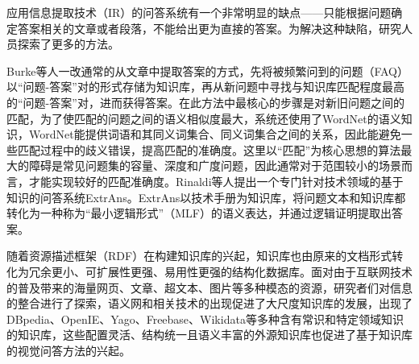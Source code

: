应用信息提取技术（IR）的问答系统有一个非常明显的缺点——只能根据问题确定答案相关的文章或者段落，不能给出更为直接的答案。为解决这种缺陷，研究人员探索了更多的方法。

Burke等人一改通常的从文章中提取答案的方式，先将被频繁问到的问题（FAQ）以“问题-答案”对的形式存储为知识库，再从新问题中寻找与知识库匹配程度最高的“问题-答案”对，进而获得答案。在此方法中最核心的步骤是对新旧问题之间的匹配，为了使匹配的问题之间的语义相似度最大，系统还使用了WordNet的语义知识，WordNet能提供词语和其同义词集合、同义词集合之间的关系，因此能避免一些匹配过程中的歧义错误，提高匹配的准确度。这里以“匹配”为核心思想的算法最大的障碍是常见问题集的容量、深度和广度问题，因此通常对于范围较小的场景而言，才能实现较好的匹配准确度。Rinaldi等人提出一个专门针对技术领域的基于知识的问答系统ExtrAns。ExtrAns以技术手册为知识库，将问题文本和知识库都转化为一种称为“最小逻辑形式”（MLF）的语义表达，并通过逻辑证明提取出答案。

随着资源描述框架（RDF）在构建知识库的兴起，知识库也由原来的文档形式转化为冗余更小、可扩展性更强、易用性更强的结构化数据库。面对由于互联网技术的普及带来的海量网页、文章、超文本、图片等多种模态的资源，研究者们对信息的整合进行了探索，语义网和相关技术的出现促进了大尺度知识库的发展，出现了DBpedia、OpenIE、Yago、Freebase、Wikidata等多种含有常识和特定领域知识的知识库，这些配置灵活、结构统一且语义丰富的外源知识库也促进了基于知识库的视觉问答方法的兴起。

